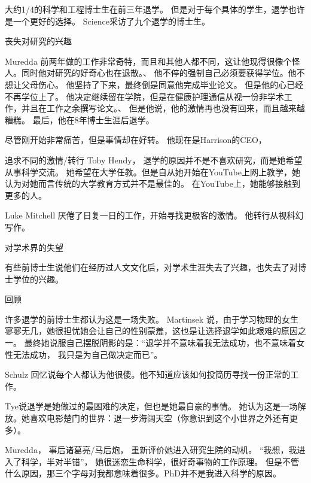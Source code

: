 大约1/4的科学和工程博士生在前三年退学。
但是对于每个具体的学生，退学也许是一个更好的选择。
Science采访了九个退学的博士生。

丧失对研究的兴趣

Muredda 前两年做的工作非常奇特，而且和其他人都不同，这让他现得很像个怪人。同时他对研究的好奇心也在退散。、
他不停的强制自己必须要获得学位。他不想让父母伤心。
他坚持了下来，最终倒是同意他完成毕业论文。
但是他的心已经不再学位上了。
他决定继续留在学院，但是在健康护理通信从视一份非学术工作，并且在工作之余撰写论文。、
但是他说，他的激情再也没有回来，而且越来越糟糕。
最后，他在8年博士生涯后退学。

尽管刚开始非常痛苦，但是事情却在好转。
他现在是Harrison的CEO，


追求不同的激情/转行
Toby Hendy， 退学的原因并不是不喜欢研究，而是她希望从事科学交流。
她希望在大学任教。但是自从她开始在YouTube上网上教学，她认为对她而言传统的大学教育方式并不是最佳的。
在YouTube上，她能够接触到更多的人。

Luke Mitchell 厌倦了日复一日的工作，开始寻找更极客的激情。
他转行从视科幻写作。

对学术界的失望

有些前博士生说他们在经历过人文文化后，对学术生涯失去了兴趣，也失去了对博士学位的兴趣。


回顾

许多退学的前博士生都认为这是一场失败。
Martinsek 说，由于学习物理的女生寥寥无几，她很担忧她会让自己的性别蒙羞，这也是让选择退学如此艰难的原因之一。
最终她说服自己摆脱阴影的是：“退学并不意味着我无法成功，也不意味着女性无法成功， 我只是为自己做决定而已”。

Schulz 回忆说每个人都认为他很傻。他不知道应该如何投简历寻找一份正常的工作。

Tye说退学是她做过的最困难的决定，但也是她最自豪的事情。
她认为这是一场解放。她喜欢电影楚门的世界：退一步海阔天空（你意识到这个小世界之外还有更多）。

Muredda， 事后诸葛亮/马后炮， 重新评价她进入研究生院的动机。
“我想，我进入了科学，半对半错”， 她很迷恋生命科学，很好奇事物的工作原理。
但是不管什么原因，那三个字母对我都意味着很多。PhD并不是我进入科学的原因。

